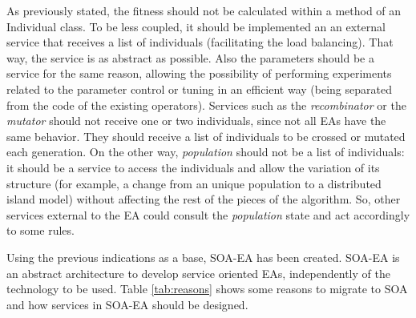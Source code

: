 As previously stated, the 
fitness should not be calculated within a method of an Individual class. To be less
coupled, it should be implemented an an external service that receives a list of individuals (facilitating the load balancing). That way, the service is as abstract as possible. Also the parameters should be
a service for the same reason, allowing the possibility of performing
experiments related to the parameter control or tuning \citep{PARAMETERTUNING11} in an efficient way
(being separated from the code of the existing operators). Services such as the
{\em recombinator} or the {\em mutator} should not receive one or two
individuals, since not all EAs have the same behavior. They should receive a
list of individuals to be crossed or mutated each generation. On the other way,
{\em population} should not be a list of individuals: it should be a service
to access the individuals and allow the variation of its structure (for example, a change
from an unique population to a distributed island model) without
affecting  the rest of the pieces of the algorithm. So, other services
external to the EA could consult the {\em population} state and act
accordingly to some rules. 

Using the previous indications as a base, SOA-EA has been created. SOA-EA is an
abstract architecture to develop service oriented EAs, independently
of the technology to be used. Table \ref{tab:reasons} shows some reasons to
migrate to SOA and how services in SOA-EA should be designed. 





